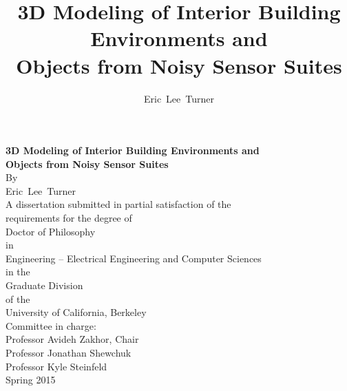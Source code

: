 \documentclass[12pt,onecolumn,oneside]{book}
\begin{document}

%
%
%

\newcommand{\mytitle}{3D Modeling of Interior Building Environments and\\Objects from Noisy Sensor Suites}
\title{\mytitle}

\newcommand{\myauthor}{Eric~Lee~Turner}
\author{\myauthor}

{\centering
	{\textbf{\mytitle}}\\
	\hfill \break
	\hfill \break
	By\\
	\hfill \break
	\myauthor\\
	\hfill \break
	\hfill \break
	\hfill \break
	A dissertation submitted in partial satisfaction of the\\	
	\hfill \break
	requirements for the degree of\\
	\hfill \break
	Doctor of Philosophy\\
	\hfill \break
	in\\
	Engineering -- Electrical Engineering and Computer Sciences\\	
	\hfill \break 
	in the\\
	\hfill \break
	Graduate Division\\
	\hfill \break
	of the\\
	\hfill \break
	University of California, Berkeley\\
	\hfill \break
	\hfill \break
	\hfill \break
	Committee in charge:\\
	\hfill \break
	Professor Avideh Zakhor, Chair\\
	Professor Jonathan Shewchuk\\
	Professor Kyle Steinfeld\\
	\hfill \break	
	\hfill \break
	Spring 2015\\
}

\end{document}
